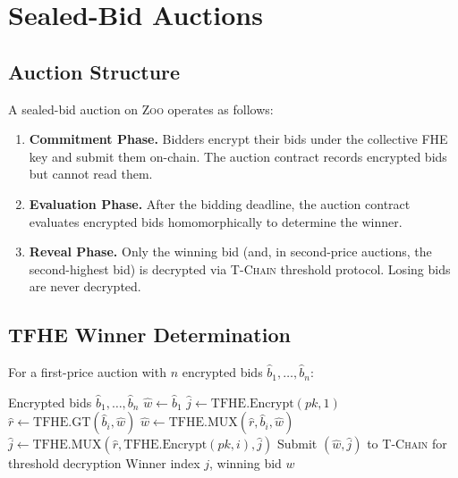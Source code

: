 \documentclass[11pt,letterpaper]{article}
\theoremstyle{definition}
\theoremstyle{remark}
\newcommand{\Zoo}{\textsc{Zoo}}
\newcommand{\TChain}{\textsc{T-Chain}}
\newcommand{\FHE}{\textsc{FHE}}
\begin{document}
\section{Sealed-Bid Auctions}
\label{sec:auctions}

\subsection{Auction Structure}

A sealed-bid auction on \Zoo{} operates as follows:

\begin{enumerate}
    \item \textbf{Commitment Phase.} Bidders encrypt their bids under the collective \FHE{} key and submit them on-chain. The auction contract records encrypted bids but cannot read them.
    \item \textbf{Evaluation Phase.} After the bidding deadline, the auction contract evaluates encrypted bids homomorphically to determine the winner.
    \item \textbf{Reveal Phase.} Only the winning bid (and, in second-price auctions, the second-highest bid) is decrypted via \TChain{} threshold protocol. Losing bids are never decrypted.
\end{enumerate}

\subsection{TFHE Winner Determination}

For a first-price auction with $n$ encrypted bids $\hat{b}_1, \ldots, \hat{b}_n$:

\begin{algorithm}
\caption{Encrypted First-Price Auction}
\begin{algorithmic}[1]
\REQUIRE Encrypted bids $\hat{b}_1, \ldots, \hat{b}_n$
\STATE $\hat{w} \leftarrow \hat{b}_1$ 
\STATE $\hat{j} \leftarrow \text{TFHE.Encrypt}(pk, 1)$ 
    \STATE $\hat{r} \leftarrow \text{TFHE.GT}(\hat{b}_i, \hat{w})$
    \STATE $\hat{w} \leftarrow \text{TFHE.MUX}(\hat{r}, \hat{b}_i, \hat{w})$
    \STATE $\hat{j} \leftarrow \text{TFHE.MUX}(\hat{r}, \text{TFHE.Encrypt}(pk, i), \hat{j})$
\ENDFOR
\STATE Submit $(\hat{w}, \hat{j})$ to \TChain{} for threshold decryption
\RETURN Winner index $j$, winning bid $w$
\end{algorithmic}
\end{algorithm}
\end{document}
